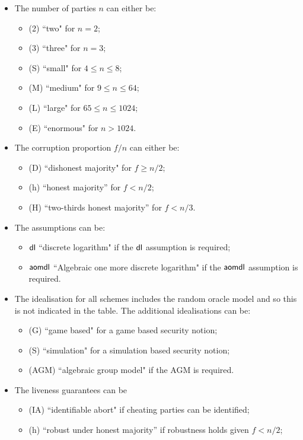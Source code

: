 \begin{itemize}
	\item The number of parties $n$ can either be:
	\begin{itemize}
		\item (2) ``two" for $n = 2$;
		\item (3) ``three" for $n = 3$;
		\item  (S) ``small" for $4 \leq n \leq 8$;
		\item  (M) ``medium" for $9 \leq n \leq 64$;
		\item (L) ``large" for $65 \leq n \leq 1024$;
		\item (E) ``enormous" for $n > 1024$.
	\end{itemize}
	\item The corruption proportion $f/n$ can either be:
		\begin{itemize}
			\item  (D) ``dishonest majority" for $f \geq n/2$;
			\item  (h) ``honest majority” for $f < n/2$;
			\item (H) “two-thirds honest majority” for $f < n/3$.
	\end{itemize}
	\item The assumptions can  be:
		\begin{itemize}
			\item $\mathsf{dl}$ ``discrete logarithm" if the $\mathsf{dl}$ assumption is required;
			\item $\mathsf{aomdl}$ ``Algebraic one more discrete logarithm" if the $\mathsf{aomdl}$ assumption is required.
		\end{itemize}
	\item 	The idealisation for all schemes includes the random oracle model and so this is not indicated in the table.  The additional idealisations can be:
		\begin{itemize}
			\item (G)  ``game based" for a game based security notion;
			\item (S) ``simulation" for a simulation based security notion;
			\item (AGM) ``algebraic group model" if the AGM is required.
		\end{itemize}
 	\item The liveness guarantees can be
 		\begin{itemize}
 			\item  (IA) ``identifiable abort" if cheating parties can be identified;
 			\item  (h) ``robust under honest majority” if robustness holds given $f < n/2$;

\end{itemize}
\end{itemize}

